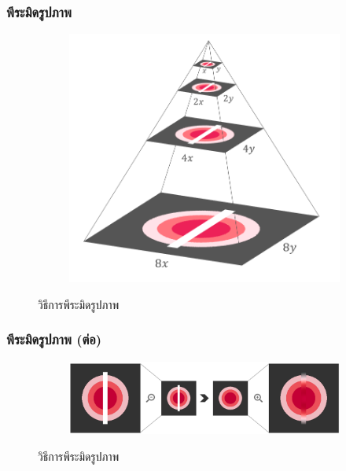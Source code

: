 \documentclass[xcolor=dvipsnames, xetex,serif]{beamer}
\numberwithin{equation}{section}
\begin{document}
    \begin{frame}
        \frametitle{พีระมิดรูปภาพ}
        \begin{figure}[H]
            \centering
            \begin{subfigure}{0.6\linewidth}
                \centering
                \includegraphics[width=0.8\linewidth]{images/image_inpaint_synthetic/image_pyramid.png}
            \end{subfigure}
            \caption{วิธีการพีระมิดรูปภาพ}
        \end{figure}
        \let\thefootnote\relax{}
    \end{frame}
    \begin{frame}
        \frametitle{พีระมิดรูปภาพ (ต่อ)}
        \begin{figure}[H]
            \centering
            \begin{subfigure}{0.8\linewidth}
                \centering
                \includegraphics[width=1\linewidth]{images/image_inpaint_synthetic/image_inital_solution.png}
            \end{subfigure}
            \caption{วิธีการพีระมิดรูปภาพ}
        \end{figure}
    \end{frame}
\end{document}
